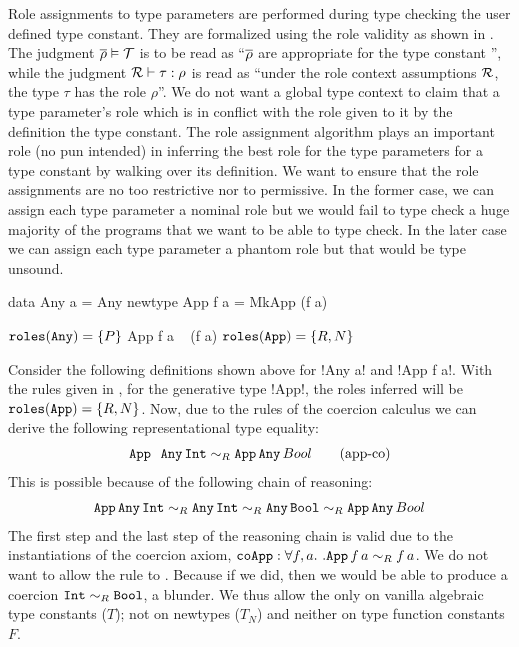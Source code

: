 \documentclass[screen,nonacm,manuscript,review]{acmart} %
\begin{document}
Role assignments to type parameters are performed during type checking
the user defined type constant. They are formalized using the role
validity as shown in . The judgment
$\overline{\rho} \mathrel{\vDash} \mathcal{T}$ is to be read as ``$\overline{\rho}$
are appropriate for the type constant \TypeConst'', while the judgment
$\mathcal{R} \vdash \tau : \rho$ is read as ``under the role context
assumptions $\mathcal{R}$, the type $\tau$ has the role $\rho$''. We do not
want a global type context to claim that a type parameter's role which
is in conflict with the role given to it by the definition the type
constant. The role assignment algorithm plays an important role (no
pun intended) in inferring the best role for the type parameters for a
type constant by walking over its definition. We want to ensure that
the role assignments are no too restrictive nor to permissive. In the
former case, we can assign each type parameter a nominal role but we
would fail to type check a huge majority of the programs that we want
to be able to type check. In the later case we can assign each type
parameter a phantom role but that would be type unsound.

\begin{minipage}{0.5\linewidth}
\begin{code}
                 data Any a = Any
                 newtype App f a = MkApp (f a)
\end{code}
\end{minipage}%
\begin{minipage}{0.5\linewidth}
\begin{code}
                 $\texttt{roles}(\texttt{Any}) = \{P\}$
                 App f a ~ (f a)
                 $\texttt{roles}(\texttt{App}) = \{R, N\}$
\end{code}
\end{minipage}

Consider the following definitions shown above for !Any a! and !App f a!.
With the rules given in , for the
generative type !App!, the roles inferred will be
$\texttt{roles}(\texttt{App}) = \{R, N\}$. Now, due to the rules of the coercion
calculus we can derive the following representational type equality:
\begin{align}\label{eqn:app-any-newtype}
  \texttt{App } \, \texttt{Any}\, \texttt{Int} \mathrel{\sim_R} \texttt{App}\,\texttt{Any} \,{Bool}\tag{app-co}
\end{align}
This is possible because of the following chain of reasoning:
\begin{align}
  \texttt{App} \App \texttt{Any}\App \texttt{Int}%
  \teqR \texttt{Any}\App \texttt{Int}%
  \teqR \texttt{Any}\App \texttt{Bool}%
  \teqR \texttt{App}\App\texttt{Any} \App{Bool}\nonumber
\end{align}
The first step and the last step of the reasoning chain is valid due to
the instantiations of the coercion axiom,
$\texttt{coApp} : \forall f,a.~. \texttt{App}\, f\, a \mathrel{\sim_R} f\, a$.
We do not want to allow the rule
 to . Because if we did, then
we would be able to produce a coercion $\texttt{Int} \mathrel{\sim_R}
\texttt{Bool}$, a blunder. We thus allow the 
only on vanilla algebraic type constants ($T$); not on newtypes
($T_N$) and neither on type function constants $F$.
\end{document}
